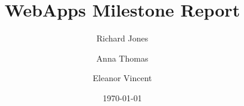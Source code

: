 \documentclass[a4wide, 11pt]{article}
\begin{document}
\title{WebApps Milestone Report}
\author{Richard Jones \and Anna Thomas \and Eleanor Vincent}
\date{\today}         %
\maketitle            %

\section{}
\end{document}
